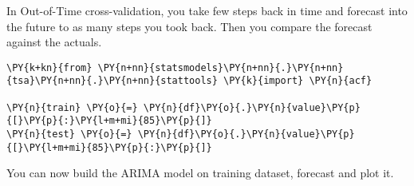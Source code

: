 In Out-of-Time cross-validation, you take few steps back in time and
forecast into the future to as many steps you took back. Then you
compare the forecast against the actuals.


\begin{codebox}[breakable, size=fbox, boxrule=1pt, pad at break*=1mm,colback=cellbackground, colframe=cellborder]
\begin{Verbatim}[commandchars=\\\{\}]
\PY{k+kn}{from} \PY{n+nn}{statsmodels}\PY{n+nn}{.}\PY{n+nn}{tsa}\PY{n+nn}{.}\PY{n+nn}{stattools} \PY{k}{import} \PY{n}{acf}

\PY{n}{train} \PY{o}{=} \PY{n}{df}\PY{o}{.}\PY{n}{value}\PY{p}{[}\PY{p}{:}\PY{l+m+mi}{85}\PY{p}{]}
\PY{n}{test} \PY{o}{=} \PY{n}{df}\PY{o}{.}\PY{n}{value}\PY{p}{[}\PY{l+m+mi}{85}\PY{p}{:}\PY{p}{]}
\end{Verbatim}
\end{codebox}

You can now build the ARIMA model on training dataset, forecast and plot
it.

